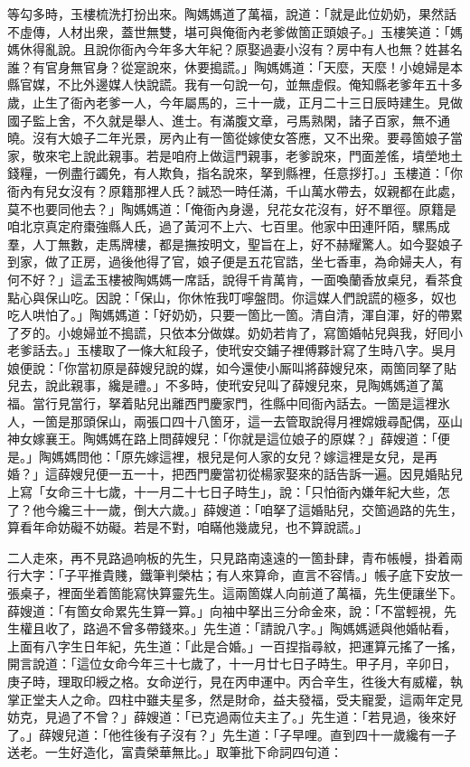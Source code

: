 等勾多時，玉樓梳洗打扮出來。陶媽媽道了萬福，說道：「就是此位奶奶，果然話不虛傳，人材出衆，蓋世無雙，堪可與俺衙內老爹做箇正頭娘子。」玉樓笑道：「媽媽休得亂說。且說你衙內今年多大年紀？原娶過妻小沒有？房中有人也無？姓甚名誰？有官身無官身？從寔說來，休要搗謊。」陶媽媽道：「天麼，天麼！小媳婦是本縣官媒，不比外邊媒人快說謊。我有一句說一句，並無虛假。俺知縣老爹年五十多歲，止生了衙內老爹一人，今年屬馬的，三十一歲，正月二十三日辰時建生。見做國子監上舍，不久就是舉人、進士。{}有滿腹文章，弓馬熟閑，諸子百家，無不通曉。沒有大娘子二年光景，房內止有一箇從嫁使女答應，又不出衆。要尋箇娘子當家，敬來宅上說此親事。若是咱府上做這門親事，老爹說來，門面差傜，墳塋地土錢糧，一例盡行蠲免，有人欺負，指名說來，拏到縣裡，任意拶打。」玉樓道：「你衙內有兒女沒有？原籍那裡人氏？誠恐一時任滿，千山萬水帶去，奴親都在此處，莫不也要同他去？」陶媽媽道：「俺衙內身邊，兒花女花沒有，好不單徑。原籍是咱北京真定府棗強縣人氏，過了黃河不上六、七百里。他家中田連阡陌，騾馬成羣，人丁無數，走馬牌樓，都是撫按明文，聖旨在上，好不赫耀驚人。如今娶娘子到家，做了正房，過後他得了官，娘子便是五花官誥，坐七香車，為命婦夫人，有何不好？」{}這孟玉樓被陶媽媽一席話，說得千肯萬肯，一面喚蘭香放桌兒，看茶食點心與保山吃。因說：「保山，你休恠我叮嚀盤問。你這媒人們說謊的極多，奴也吃人哄怕了。」{}陶媽媽道：「好奶奶，只要一箇比一箇。清自清，渾自渾，好的帶累了歹的。小媳婦並不搗謊，只依本分做媒。奶奶若肯了，寫箇婚帖兒與我，好囘小老爹話去。」玉樓取了一條大紅段子，使玳安交鋪子裡傅夥計寫了生時八字。吳月娘便說：「你當初原是薛嫂兒說的媒，如今還使小厮叫將薛嫂兒來，兩箇同拏了貼兒去，說此親事，纔是禮。」不多時，使玳安兒叫了薛嫂兒來，見陶媽媽道了萬福。當行見當行，拏着貼兒出離西門慶家門，徃縣中囘衙內話去。一箇是這裡氷人，一箇是那頭保山，兩張口四十八箇牙，這一去管取說得月裡嫦娥尋配偶，巫山神女嫁襄王。陶媽媽在路上問薛嫂兒：「你就是這位娘子的原媒？」薛嫂道：「便是。」陶媽媽問他：「原先嫁這裡，根兒是何人家的女兒？嫁這裡是女兒，是再婚？」這薛嫂兒便一五一十，把西門慶當初從楊家娶來的話告訴一遍。因見婚貼兒上寫「女命三十七歲，十一月二十七日子時生」，說：「只怕衙內嫌年紀大些，怎了？他今纔三十一歲，倒大六歲。」薛嫂道：「咱拏了這婚貼兒，交箇過路的先生，算看年命妨礙不妨礙。若是不對，咱瞞他幾歲兒，也不算說謊。」{}

二人走來，再不見路過响板的先生，只見路南遠遠的一箇卦肆，青布帳幔，掛着兩行大字：「子平推貴賤，鐵筆判榮枯；有人來算命，直言不容情。」帳子底下安放一張桌子，裡面坐着箇能寫快算靈先生。這兩箇媒人向前道了萬福，先生便讓坐下。薛嫂道：「有箇女命累先生算一算。」向袖中拏出三分命金來，說：「不當輕視，先生權且收了，路過不曾多帶錢來。」先生道：「請說八字。」陶媽媽遞與他婚帖看，上面有八字生日年紀，先生道：「此是合婚。」一百捏指尋紋，把運算元搖了一搖，開言說道：「這位女命今年三十七歲了，十一月廿七日子時生。甲子月，辛卯日，庚子時，理取印綬之格。女命逆行，見在丙申運中。丙合辛生，徃後大有威權，執掌正堂夫人之命。四柱中雖夫星多，然是財命，益夫發福，受夫寵愛，這兩年定見妨克，見過了不曾？」薛嫂道：「已克過兩位夫主了。」先生道：「若見過，後來好了。」薛嫂兒道：「他徃後有子沒有？」先生道：「子早哩。直到四十一歲纔有一子送老。一生好造化，富貴榮華無比。」{}取筆批下命詞四句道：

